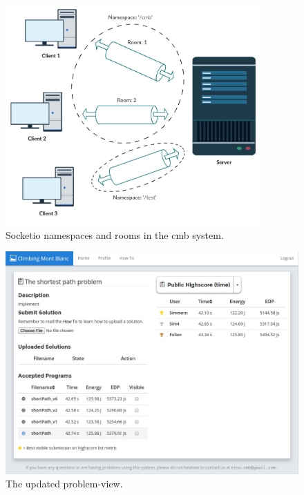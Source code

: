 \begin{figure}
    \centering
    \includegraphics[width=0.87\textwidth]{figs/namespaces_and_rooms.jpg}
    \caption[Socketio namespaces and rooms in the \gls{cmb} system]{Socketio namespaces and rooms in the \gls{cmb} system. }
    \label{fig:namespaces-and-rooms}
\end{figure}

\clearpage

\begin{figure}
    \includegraphics[width=1.0\textwidth]{figs/problem_view.jpg}
    \caption[The updated problem-view]{The updated problem-view.}
    \label{fig:problem-view}
\end{figure}

